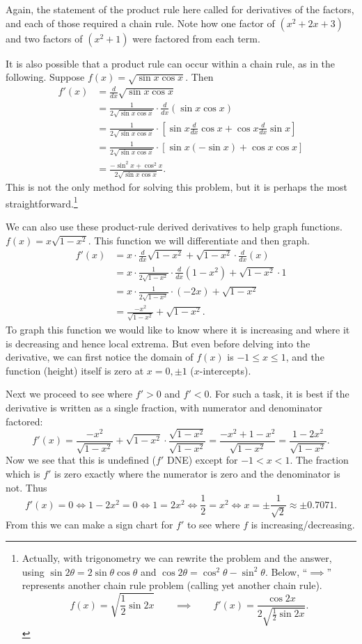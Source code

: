 Again, the statement of the product rule here called for
derivatives of the factors, and each of those required a 
chain rule.  Note how one factor of $(x^2+2x+3)$ and two
factors of $(x^2+1)$ were factored from each term.
\eex

It is also possible that a product rule can occur within 
a chain rule, as in the following.
\bex Suppose $f(x)=\sqrt{\sin x\cos x}$.  Then
\begin{align*}
f'(x)&=\frac{d}{dx}\sqrt{\sin x\cos x}\\
    &=\frac1{2\sqrt{\sin x\cos x}}\cdot\frac{d}{dx}(\sin x\cos x)\\
    &=\frac1{2\sqrt{\sin x\cos x}}\cdot\left[\sin x\frac{d}{dx}\cos x
             +\cos x\frac{d}{dx}\sin x\right]\\
   &=\frac1{2\sqrt{\sin x\cos x}}\cdot\left[\sin x(-\sin x)
             +\cos x\cos x\right]\\
   &=\frac{-\sin^2x+\cos^2x}{2\sqrt{\sin x\cos x}}.
\end{align*}
This is not the only method for solving this problem, but it
is perhaps the most straightforward.\footnote{%
Actually, 
with trigonometry we can rewrite the problem and the answer,
using $\sin2\theta=2\sin\theta\cos\theta$ and
$\cos2\theta=\cos^2\theta-\sin^2\theta$.  Below,
``$\implies$'' represents another chain rule problem
(calling yet another chain rule).
$$f(x)=\sqrt{\frac12\sin2x}
\qquad\implies\qquad f'(x)=\frac{\cos2x}{2\sqrt{
   \frac12\sin2x}}.$$}
\eex


We can also use these product-rule derived
derivatives to help graph functions.
\bex $f(x)=x\sqrt{1-x^2}$.  This function we will differentiate and
then graph.
\begin{align*}
f'(x)&=x\cdot\frac{d}{dx}\sqrt{1-x^2}+\sqrt{1-x^2}\cdot\frac{d}{dx}(x)\\
&=x\cdot\frac1{2\sqrt{1-x^2}}\cdot\frac{d}{dx}(1-x^2)
+\sqrt{1-x^2}\cdot1\\
&=x\cdot\frac{1}{2\sqrt{1-x^2}}\cdot(-2x)+\sqrt{1-x^2}\\
&=\frac{-x^2}{\sqrt{1-x^2}}+\sqrt{1-x^2}.\end{align*}
To graph this function we would like to know where it is
increasing and where it is decreasing and hence local extrema. 
But even before delving into the derivative, we
can first notice the domain of $f(x)$ is $-1\le x\le 1$,
and the function (height) itself is zero at $x=0,\pm 1$
($x$-intercepts).

Next we proceed to see where $f'>0$ and $f'<0$.
For such a task, it is best if the derivative
is written as a single fraction, with numerator and denominator
factored:
$$f'(x)=\frac{-x^2}{\sqrt{1-x^2}}+\sqrt{1-x^2}\cdot
\frac{\sqrt{1-x^2}}{\sqrt{1-x^2}}=\frac{-x^2+1-x^2}{\sqrt{1-x^2}}
=\frac{1-2x^2}{\sqrt{1-x^2}}.$$
Now we see that this is undefined ($f'$ DNE)
except for $-1<x<1$.
The fraction which is $f'$ is zero exactly where the numerator
is zero and the denominator is not.  Thus 
$$f'(x)=0\iff 1-2x^2=0\iff 1=2x^2\iff \frac12=x^2\iff x=\pm\frac1{\sqrt2}
\approx\pm0.7071.$$
From this we can make a sign chart for $f'$ to see where $f$ is
increasing/decreasing.

